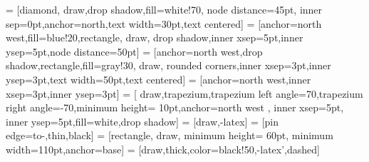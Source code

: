 

 = [diamond, draw,drop shadow,fill=white!70, 
      node distance=45pt, inner sep=0pt,anchor=north,text width=30pt,text centered]
 = [anchor=north west,fill=blue!20,rectangle, draw, drop shadow,inner xsep=5pt,inner ysep=5pt,node distance=50pt]
 = [anchor=north west,drop shadow,rectangle,fill=gray!30, draw, rounded corners,inner xsep=3pt,inner ysep=3pt,text width=50pt,text centered]
 = [anchor=north west,inner xsep=3pt,inner ysep=3pt]
 = [ draw,trapezium,trapezium left angle=70,trapezium right angle=-70,minimum height=
10pt,anchor=north west , inner xsep=5pt, inner ysep=5pt,fill=white,drop shadow]
 = [draw,-latex]
 = [pin edge={to-,thin,black}]
 = [rectangle, draw, minimum height= 60pt, minimum width=110pt,anchor=base]
 = [draw,thick,color=black!50,-latex',dashed]
